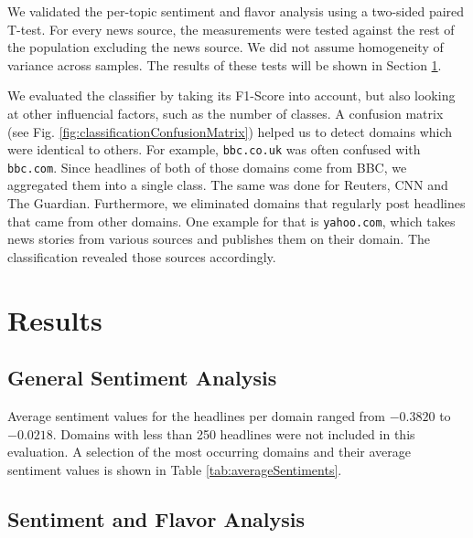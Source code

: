 \documentclass[final]{ieee}
\begin{document}
We validated the per-topic sentiment and flavor analysis using a two-sided paired T-test. For every news source, the measurements were tested against the rest of the population excluding the news source. We did not assume homogeneity of variance across samples. The results of these tests will be shown in Section \ref{sec:results}.

We evaluated the classifier by taking its F1-Score into account, but also looking at other influencial factors, such as the number of classes. A confusion matrix (see Fig. \ref{fig:classificationConfusionMatrix}) helped us to detect domains which were identical to others. For example, \texttt{bbc.co.uk} was often confused with \texttt{bbc.com}. Since headlines of both of those domains come from BBC, we aggregated them into a single class. The same was done for Reuters, CNN and The Guardian. Furthermore, we eliminated domains that regularly post headlines that came from other domains. One example for that is \texttt{yahoo.com}, which takes news stories from various sources and publishes them on their domain. The classification revealed those sources accordingly.

\section{Results}\label{sec:results}



\subsection{General Sentiment Analysis}

Average sentiment values for the headlines per domain ranged from $-0.3820$ to $-0.0218$. Domains with less than 250 headlines were not included in this evaluation. A selection of the most occurring domains and their average sentiment values is shown in Table \ref{tab:averageSentiments}.

\subsection{Sentiment and Flavor Analysis}\label{sec:sentiment flavor results}
\end{document}
